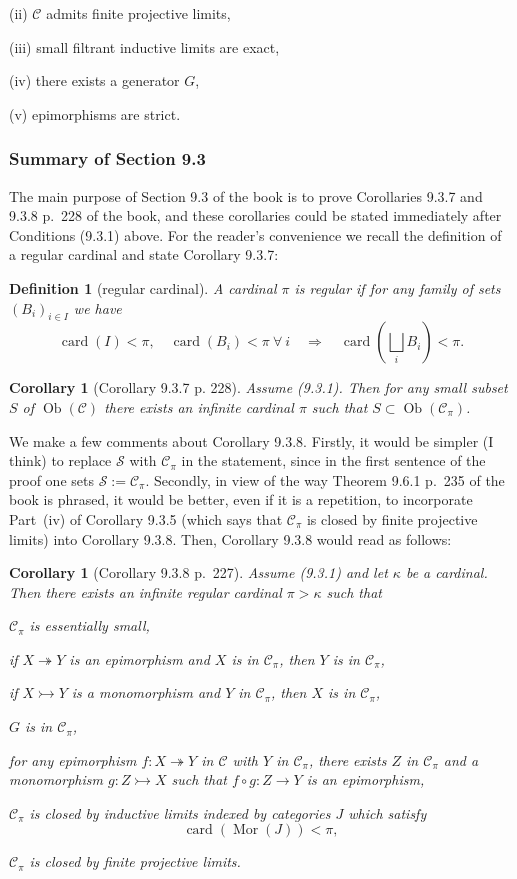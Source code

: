 \documentclass[12pt]{article}
\newtheorem{cor}[thm]{Corollary}
\newtheorem{df}[thm]{Definition}
\theoremstyle{remark}
\theoremstyle{definition}
\newcommand{\nn}{\noindent}
\newcommand{\cc}{\mathcal}
\newcommand{\C}{\mathcal C}
\newcommand{\epi}{\twoheadrightarrow}
\newcommand{\mono}{\rightarrowtail}
\newcommand{\then}{\Rightarrow}
\DeclareMathOperator{\card}{card}
\DeclareMathOperator{\Mor}{Mor}
\DeclareMathOperator{\Ob}{Ob}
\begin{document}
(ii) $\C$ admits finite projective limits,

(iii) small filtrant inductive limits are exact, 

(iv) there exists a generator $G$,

(v) epimorphisms are strict.

\subsubsection{Summary of Section 9.3}

The main purpose of Section 9.3 of the book is to prove Corollaries 9.3.7 and 9.3.8 p.~228 of the book, and these corollaries could be stated immediately after Conditions (9.3.1) above. For the reader's convenience we recall the definition of a regular cardinal and state Corollary 9.3.7:

\begin{df}[regular cardinal]\label{rc} 
A cardinal $\pi$ is \emph{regular} if for any family of sets $(B_i)_{i\in I}$ we have 
$$
\card(I)<\pi,\quad\card(B_i)<\pi\ \forall\ i\quad\then\quad\card\left(\bigsqcup_iB_i\right)<\pi.
$$
\end{df}

\begin{cor}[Corollary 9.3.7 p. 228]
Assume (9.3.1). Then for any small subset $S$ of $\Ob(\C)$ there exists an infinite cardinal $\pi$ such that $S\subset\Ob(\C_\pi)$.
\end{cor}

We make a few comments about Corollary 9.3.8. Firstly, it would be simpler (I think) to replace $\cc S$ with $\C_\pi$ in the statement, since in the first sentence of the proof one sets $\cc S:=\C_\pi$. Secondly, in view of the way Theorem 9.6.1 p.~235 of the book is phrased, it would be better, even if it is a repetition, to incorporate Part~(iv) of Corollary 9.3.5 (which says that $\C_\pi$ is closed by finite projective limits) into Corollary 9.3.8. Then, Corollary 9.3.8 would read as follows:

\begin{cor}[Corollary 9.3.8 p.~227]\label{938}
Assume (9.3.1) and let $\kappa$ be a cardinal. Then there exists an infinite regular cardinal $\pi>\kappa$ such that 

\nn{\em(i)} $\C_\pi$ is essentially small,

\nn{\em(ii)} if $X\epi Y$ is an epimorphism and $X$ is in $\C_\pi$, then $Y$ is in $\C_\pi$,

\nn{\em(iii)} if $X\mono Y$ is a monomorphism and $Y$ in $\C_\pi$, then $X$ is in $\C_\pi$,

\nn{\em(iv)} $G$ is in $\C_\pi$,

\nn{\em(v)} for any epimorphism $f:X\epi Y$ in $\C$ with $Y$ in $\C_\pi$, there exists $Z$ in $\C_\pi$ and a monomorphism $g:Z\mono X$ such that $f\circ g:Z\to Y$ is an epimorphism,

\nn{\em(vi)} $\C_\pi$ is closed by inductive limits indexed by categories $J$ which satisfy $$\card(\Mor(J))<\pi,$$

\nn{\em(vii)} $\C_\pi$ is closed by finite projective limits.
\end{cor}
\end{document}
